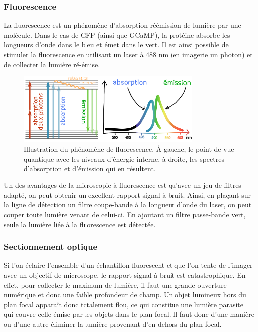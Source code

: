 \subsubsection{Fluorescence}

La fluorescence est un phénomène d’absorption-réémission de lumière par une molécule. Dans le cas de GFP (ainsi que GCaMP), la protéine absorbe les longueurs d'onde dans le bleu et émet dans le vert. Il est ainsi possible de stimuler la fluorescence en utilisant un laser à 488 nm (en imagerie un photon) et de collecter la lumière ré-émise. 

\begin{figure}
\centering
\includegraphics[width=0.8\textwidth]{./files/fluo_couleur.svg.png}
\caption{Illustration du phénomène de fluorescence. À gauche, le point de vue quantique avec les niveaux d'énergie interne, à droite, les spectres d’absorption et d'émission qui en résultent.}
\end{figure}

Un des avantages de la microscopie à fluorescence est qu'avec un jeu de filtres adapté, on peut obtenir un excellent rapport signal à bruit. Ainsi, en plaçant sur la ligne de détection un filtre coupe-bande à la longueur d'onde du laser, on peut couper toute lumière venant de celui-ci. En ajoutant un filtre passe-bande vert, seule la lumière liée à la fluorescence est détectée.

\subsubsection{Sectionnement optique}

Si l'on éclaire l'ensemble d'un échantillon fluorescent et que l'on tente de l'imager avec un objectif de microscope, le rapport signal à bruit est catastrophique. En effet, pour collecter le maximum de lumière, il faut une grande ouverture numérique et donc une faible profondeur de champ. Un objet lumineux hors du plan focal apparaît donc totalement flou, ce qui constitue une lumière parasite qui couvre celle émise par les objets dans le plan focal. Il faut donc d'une manière ou d'une autre éliminer la lumière provenant d'en dehors du plan focal.

